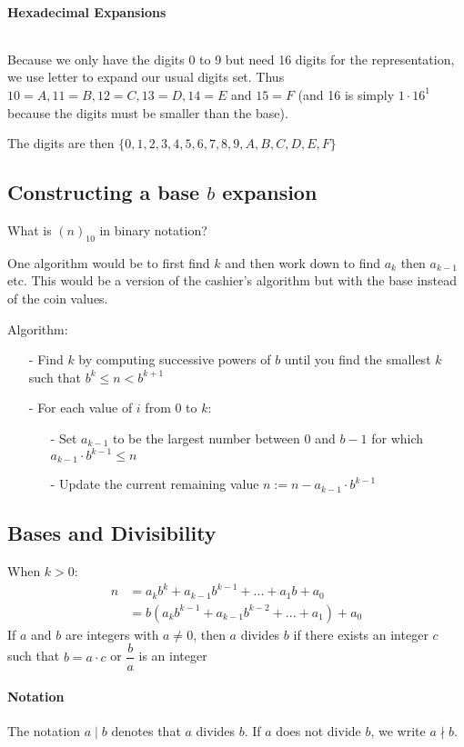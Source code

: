 \documentclass[10pt,a4paper]{book}
\begin{document}
\paragraph*{Hexadecimal Expansions}
$\ $\par
Because we only have the digits 0 to 9 but need 16 digits for the representation, we use letter to expand our usual digits set. Thus $10=A, 11=B, 12=C, 13=D, 14=E$ and $15=F$ (and 16 is simply $1\cdot 16^1$ because the digits must be smaller than the base).\par 
The digits are then $\{0,1,2,3,4,5,6,7,8,9,A,B,C,D,E,F\}$
\subsection{Constructing a base \texorpdfstring{$b$}{b} expansion}
What is $(n)_10$ in binary notation?\par
One algorithm would be to first find $k$ and then work down to find $a_k$ then $a_{k-1}$ etc. This would be a version of the cashier's algorithm but with the base instead of the coin values.\par 
Algorithm:
\begin{itemize}
\item[-] Find $k$ by computing successive powers of $b$ until you find the smallest $k$ such that $b^k \leq n < b^{k+1}$
\item[-] For each value of $i$ from 0 to $k$:
	\begin{itemize}
	\item[-] Set $a_{k-1}$ to be the largest number between 0 and $b-1$ for which $a_{k-1}\cdot b^{k-1} \leq n$
	\item[-] Update the current remaining value $n := n-a_{k-1}\cdot b^{k-1}$
	\end{itemize}
\end{itemize}
\subsection{Bases and Divisibility}
When $k > 0$: 
\begin{align*}
n &= a_kb^k + a_{k-1}b^{k-1} + ... + a_1b + a_0\\
  &= b(a_kb^{k-1} + a_{k-1}b^{k-2} + ... + a_1) + a_0
\end{align*}
If $a$ and $b$ are integers with $a \neq 0$, then $a$ divides $b$ if there exists an integer $c$ such that $b=a\cdot c$ or $\dfrac{b}{a}$ is an integer
\paragraph*{Notation}
The notation $a \mid b$ denotes that $a$ divides $b$. If $a$ does not divide $b$, we write $a \nmid b$.
\end{document}
